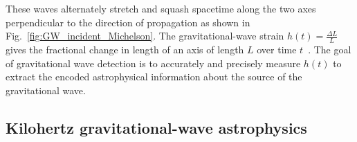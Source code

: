 These waves alternately stretch and squash spacetime along the two axes perpendicular to the direction of propagation as shown in Fig.~\ref{fig:GW_incident_Michelson}. %
The gravitational-wave strain $h(t)=\frac{\Delta L}{L}$ gives the fractional change in length of an axis of length $L$ over time $t$~\cite{cai_2017}. The goal of gravitational wave detection is to accurately and precisely measure $h(t)$ to extract the encoded astrophysical information about the source of the gravitational wave.


\subsection{Kilohertz gravitational-wave astrophysics} %
\label{sec:kilohertz_GW}

